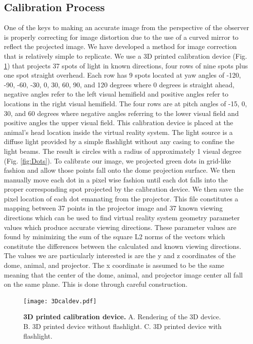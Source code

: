 \documentclass[10pt,letterpaper]{article}
\begin{document}
\subsection*{Calibration Process}
One of the keys to making an accurate image from the perspective of the
observer is properly correcting for image distortion due to the use of a curved
mirror to reflect the projected image. We have developed a method for image
correction that is relatively simple to replicate. We use a 3D printed
calibration device (Fig. \ref{fig:3Ddev}) that projects 37 spots of light in
known directions, four rows of nine spots plus one spot straight overhead. Each
row has 9 spots located at yaw angles of -120, -90, -60, -30, 0, 30, 60, 90,
and 120 degrees where 0 degrees is straight ahead, negative angles refer to the
left visual hemifield and positive angles refer to locations in the right
visual hemifield. The four rows are at pitch angles of -15, 0, 30, and 60
degrees where negative angles referring to the lower visual field and positive
angles the upper visual field. This calibration device is placed at the
animal's head location inside the virtual reality system. The light source is a
diffuse light provided by a simple flashlight without any casing to confine the
light beams. The result is circles with a radius of approximately 1 visual
degree (Fig. \ref{fig:Dots}). To calibrate our image, we projected green dots
in grid-like fashion and allow those points fall onto the dome projection
surface. We then manually move each dot in a pixel wise fashion until each dot
falls into the proper corresponding spot projected by the calibration device.
We then save the pixel location of each dot emanating from the projector. This
file constitutes a mapping between 37 points in the projector image and 37
known viewing directions which can be used to find virtual reality system
geometry parameter values which produce accurate viewing directions. These
parameter values are found by minimizing the sum of the square L2 norms of the
vectors which constitute the differences between the calculated and known
viewing directions. The values we are particularly interested is are the y and
z coordinates of the dome, animal, and projector. The x coordinate is assumed
to be the same meaning that the center of the dome, animal, and projector image
center all fall on the same plane. This is done through careful construction. 

\begin{figure}[h]
\centering
\texttt{[image: 3Dcaldev.pdf]}
\caption{{\bf 3D printed calibration device.} A. Rendering of the 3D device. B.
        3D printed device without flashlight. C. 3D printed device with
        flashlight.}

\label{fig:3Ddev}
\end{figure}
\end{document}

